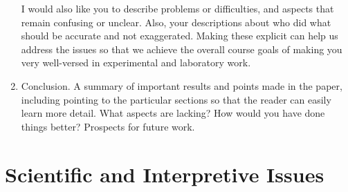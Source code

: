 \documentclass[12pt,preprint]{aastex}
\begin{document}
\begin{enumerate}
I would also like you to describe problems or difficulties, and aspects
that remain confusing or unclear. Also, your descriptions about who did
what should be accurate and not exaggerated. Making these explicit can
help us address the issues so that we achieve the overall course goals
of making you very well-versed in experimental and laboratory work.
 
\item Conclusion. A summary of important results and points made in the
  paper, including pointing to the particular sections so that the reader
  can easily learn more detail. What aspects are lacking? How would
  you have done things better? Prospects for future work.
  

\end{enumerate}

\section{Scientific and Interpretive Issues}
\end{document}
